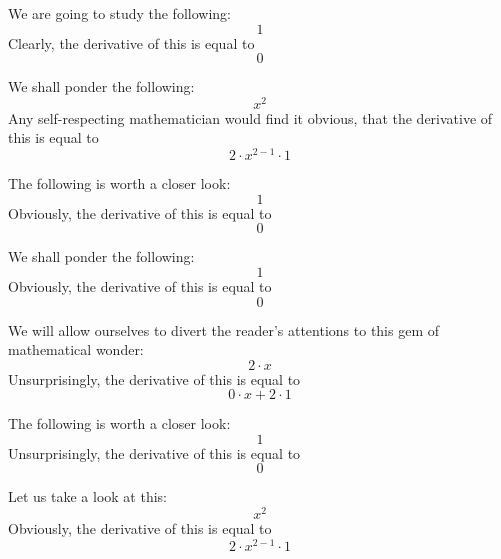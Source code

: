 \documentclass{article}
\begin{document}
We are going to study the following:
\begin{equation}
1 
\end{equation}
Clearly, the derivative of this is equal to
\begin{equation}
0 
\end{equation}

We shall ponder the following:
\begin{equation}
x ^{2 } 
\end{equation}
Any self-respecting mathematician would find it obvious, that the derivative of this is equal to
\begin{equation}
2 \cdot x ^{2 - 1 } \cdot 1 
\end{equation}

The following is worth a closer look:
\begin{equation}
1 
\end{equation}
Obviously, the derivative of this is equal to
\begin{equation}
0 
\end{equation}

We shall ponder the following:
\begin{equation}
1 
\end{equation}
Obviously, the derivative of this is equal to
\begin{equation}
0 
\end{equation}

We will allow ourselves to divert the reader's attentions to this gem of mathematical wonder:
\begin{equation}
2 \cdot x 
\end{equation}
Unsurprisingly, the derivative of this is equal to
\begin{equation}
0 \cdot x + 2 \cdot 1 
\end{equation}

The following is worth a closer look:
\begin{equation}
1 
\end{equation}
Unsurprisingly, the derivative of this is equal to
\begin{equation}
0 
\end{equation}

Let us take a look at this:
\begin{equation}
x ^{2 } 
\end{equation}
Obviously, the derivative of this is equal to
\begin{equation}
2 \cdot x ^{2 - 1 } \cdot 1 
\end{equation}
\end{document}
